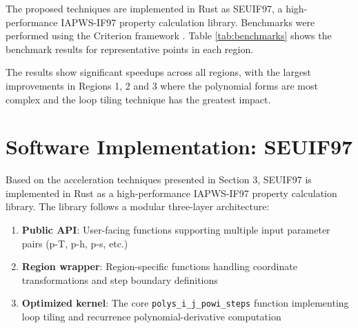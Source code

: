 \documentclass{article}
\begin{document}
The proposed techniques are implemented in Rust as SEUIF97, a high-performance IAPWS-IF97 property calculation library. Benchmarks were performed using the Criterion framework \cite{Criterion}. Table \ref{tab:benchmarks} shows the benchmark results for representative points in each region.

\begin{table}[H]
\centering
\caption{Performance benchmark results}
\label{tab:benchmarks}
\end{table}

The results show significant speedups across all regions, with the largest improvements in Regions 1, 2 and 3 where the polynomial forms are most complex and the loop tiling technique has the greatest impact.

\section{Software Implementation: SEUIF97}

Based on the acceleration techniques presented in Section 3, SEUIF97 is implemented in Rust as a high-performance IAPWS-IF97 property calculation library. The library follows a modular three-layer architecture:

\begin{enumerate}
    \item \textbf{Public API}: User-facing functions supporting multiple input parameter pairs (p-T, p-h, p-s, etc.)
    \item \textbf{Region wrapper}: Region-specific functions handling coordinate transformations and step boundary definitions
    \item \textbf{Optimized kernel}: The core \texttt{polys\_i\_j\_powi\_steps} function implementing loop tiling and recurrence polynomial-derivative computation
\end{enumerate}
\end{document}
